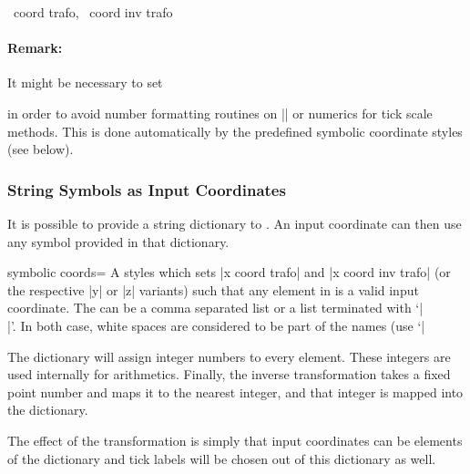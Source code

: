 \begin{pgfplotsxycodekeylist}{
	\x\ coord trafo,
	\x\ coord inv trafo}
	\paragraph{Remark:} It might be necessary to set
\begin{codeexample}
\end{codeexample}
	\noindent in order to avoid number formatting routines on |\tick| or numerics for tick scale methods. This is done automatically by the predefined symbolic coordinate styles (see below).
\end{pgfplotsxycodekeylist}

\subsubsection{String Symbols as Input Coordinates}
It is possible to provide a string dictionary to \PGFPlots. An input coordinate can then use any symbol provided in that dictionary.
\begin{pgfplotsxykeylist}{symbolic \x\space coords=}%
	A styles which sets |x coord trafo| and |x coord inv trafo| (or the respective |y| or |z| variants) such that any element in  is a valid input coordinate. The  can be a comma separated list or a list terminated with `|\\|'. In both case, white spaces are considered to be part of the names (use `|%

	The dictionary will assign integer numbers to every element. These integers are used internally for arithmetics. Finally, the inverse transformation takes a fixed point number and maps it to the nearest integer, and that integer is mapped into the dictionary.
\begin{codeexample}[]
\end{codeexample}
	
	The effect of the transformation is simply that input coordinates can be elements of the dictionary and tick labels will be chosen out of this dictionary as well.
\end{pgfplotsxykeylist}

